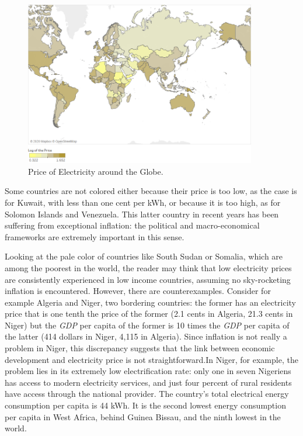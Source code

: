 \documentclass[a4paper,12pt]{book}
\begin{document}
\begin{figure}[hbt]
\begin{center}
\includegraphics[width=0.9\textwidth]{Images/world2020.png}
\end{center}
\captionsetup{justification=centering}
\caption{Price of Electricity around the Globe.}
\label{fig:world_cost}
\end{figure}

Some countries are not colored either because their price is too low, as the case is for Kuwait, with less than one cent per kWh, or because it is too high, as for Solomon Islands and Venezuela. This latter country in recent years has been suffering from exceptional inflation: the political and macro-economical frameworks are extremely important in this sense.

Looking at the pale color of countries like South Sudan or Somalia, which are among the poorest in the world, the reader may think that low electricity prices are consistently experienced in low income countries, assuming no sky-rocketing inflation is encountered. However, there are counterexamples. Consider for example Algeria and Niger, two bordering countries: the former has an electricity price that is one tenth the price of the former (2.1 cents in Algeria, 21.3 cents in Niger) but the \textit{GDP} per capita of the former is 10 times the \textit{GDP} per capita of the latter (414 dollars in Niger, 4,115 in Algeria). Since inflation is not really a problem in Niger, this discrepancy suggests that the link between economic development and electricity price is not straightforward.In Niger, for example, the problem lies in its extremely low electrification rate: only one in seven Nigeriens has access to modern electricity services, and just four percent of rural residents have access through the national provider. The country's total electrical energy consumption per capita is 44 kWh. It is the second lowest energy consumption per capita in West Africa, behind Guinea Bissau, and the ninth lowest in the world.
\end{document}
